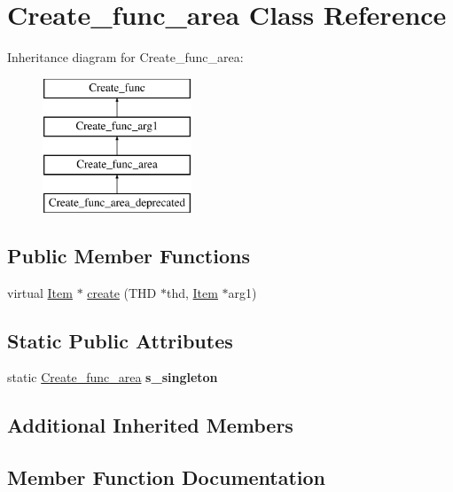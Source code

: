 \hypertarget{classCreate__func__area}{}\section{Create\+\_\+func\+\_\+area Class Reference}
\label{classCreate__func__area}
Inheritance diagram for Create\+\_\+func\+\_\+area\+:\begin{figure}[H]
\begin{center}
\leavevmode
\includegraphics[height=4.000000cm]{classCreate__func__area}
\end{center}
\end{figure}
\subsection*{Public Member Functions}
\begin{DoxyCompactItemize}
\item 
virtual \mbox{\hyperlink{classItem}{Item}} $\ast$ \mbox{\hyperlink{classCreate__func__area_aa99a51d37fda13a4759b9592b72c4fec}{create}} (T\+HD $\ast$thd, \mbox{\hyperlink{classItem}{Item}} $\ast$arg1)
\end{DoxyCompactItemize}
\subsection*{Static Public Attributes}
\begin{DoxyCompactItemize}
\item 
\mbox{\label{classCreate__func__area_a87eff36902c60d34aff8f88a6bd98f2b}} 
static \mbox{\hyperlink{classCreate__func__area}{Create\+\_\+func\+\_\+area}} {\bfseries s\+\_\+singleton}
\end{DoxyCompactItemize}
\subsection*{Additional Inherited Members}


\subsection{Member Function Documentation}
\mbox{\label{classCreate__func__area_aa99a51d37fda13a4759b9592b72c4fec}} 
